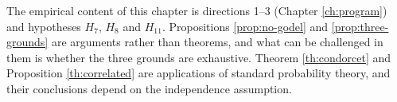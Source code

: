 The empirical content of this chapter is directions 1--3 (Chapter \ref{ch:program}) and
hypotheses $H_7$, $H_8$ and $H_{11}$. Propositions \ref{prop:no-godel} and
\ref{prop:three-grounds} are arguments rather than theorems, and what can be challenged in
them is whether the three grounds are exhaustive. Theorem \ref{th:condorcet} and
Proposition \ref{th:correlated} are applications of standard probability theory, and their
conclusions depend on the independence assumption.
